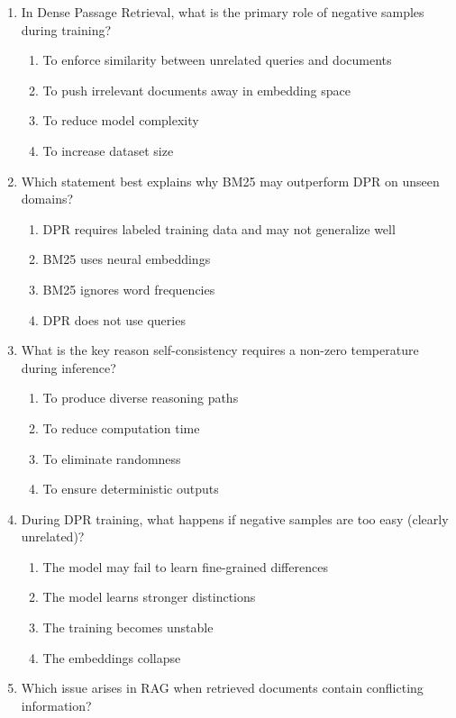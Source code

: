 \documentclass[12pt]{article}
\begin{document}
\begin{enumerate}[label=Q\arabic*.]
\item In Dense Passage Retrieval, what is the primary role of negative samples during training?
\begin{enumerate}[label=(\Alph*)]
    \item To enforce similarity between unrelated queries and documents
    \item To push irrelevant documents away in embedding space
    \item To reduce model complexity
    \item To increase dataset size
\end{enumerate}
\item Which statement best explains why BM25 may outperform DPR on unseen domains?
\begin{enumerate}[label=(\Alph*)]
    \item DPR requires labeled training data and may not generalize well
    \item BM25 uses neural embeddings
    \item BM25 ignores word frequencies
    \item DPR does not use queries
\end{enumerate}
\item What is the key reason self-consistency requires a non-zero temperature during inference?
\begin{enumerate}[label=(\Alph*)]
    \item To produce diverse reasoning paths
    \item To reduce computation time
    \item To eliminate randomness
    \item To ensure deterministic outputs
\end{enumerate}
\item During DPR training, what happens if negative samples are too easy (clearly unrelated)?
\begin{enumerate}[label=(\Alph*)]
    \item The model may fail to learn fine-grained differences
    \item The model learns stronger distinctions
    \item The training becomes unstable
    \item The embeddings collapse
\end{enumerate}
\item Which issue arises in RAG when retrieved documents contain conflicting information?
\begin{enumerate}[label=(\Alph*)]

\end{enumerate}
\end{enumerate}
\end{document}
